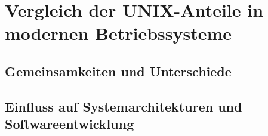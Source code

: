 \section{Vergleich der UNIX-Anteile in modernen Betriebssysteme}
\subsection{Gemeinsamkeiten und Unterschiede}
\subsection{Einfluss auf Systemarchitekturen und Softwareentwicklung}